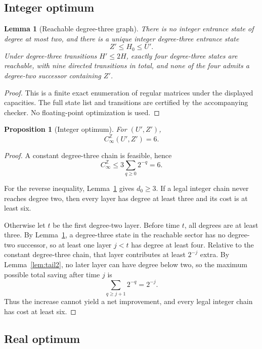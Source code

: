 \documentclass[11pt]{article}
\newtheorem{proposition}[theorem]{Proposition}
\newtheorem{lemma}[theorem]{Lemma}
\theoremstyle{definition}
\newcommand{\Z}{\mathbb Z}
\begin{document}
\subsection{Integer optimum}

\begin{lemma}[Reachable degree-three graph]
\label{lem:reachgraph}
There is no integer entrance state of degree at most two, and there is a unique integer
degree-three entrance state
\[
Z'\le H_0\le U'.
\]
Under degree-three transitions $H'\le2H$, exactly four degree-three states are reachable, with
nine directed transitions in total, and none of the four admits a degree-two successor containing
$Z'$.
\end{lemma}

\begin{proof}
This is a finite exact enumeration of regular matrices under the displayed capacities.
The full state list and transitions are certified by the accompanying checker.
No floating-point optimization is used.
\end{proof}

\begin{proposition}[Integer optimum]
\label{prop:intopt}
For $(U',Z')$,
\[
C_\infty^\Z(U',Z')=6.
\]
\end{proposition}

\begin{proof}
A constant degree-three chain is feasible, hence
\[
C_\infty^\Z\le3\sum_{q\ge0}2^{-q}=6.
\]

For the reverse inequality, Lemma~\ref{lem:reachgraph} gives $d_0\ge3$.
If a legal integer chain never reaches degree two, then every layer has degree at least three and
its cost is at least six.

Otherwise let $t$ be the first degree-two layer.  Before time $t$, all degrees are at least three.
By Lemma~\ref{lem:reachgraph}, a degree-three state in the reachable sector has no degree-two
successor, so at least one layer $j<t$ has degree at least four.
Relative to the constant degree-three chain, that layer contributes at least $2^{-j}$ extra.
By Lemma~\ref{lem:tail2}, no later layer can have degree below two, so the maximum possible total
saving after time $j$ is
\[
\sum_{q\ge j+1}2^{-q}=2^{-j}.
\]
Thus the increase cannot yield a net improvement, and every legal integer chain has cost at least
six.
\end{proof}

\subsection{Real optimum}
\end{document}

